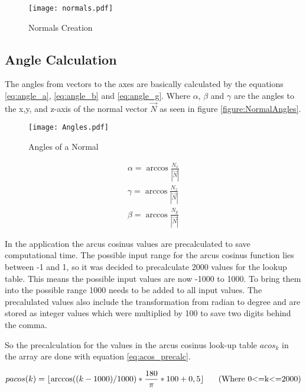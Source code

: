 \begin{figure}[H]
\begin{center}
  \texttt{[image: normals.pdf]}
  \caption{Normals Creation}
  \label{figure:normals}
\end{center}
\end{figure}

\subsection{Angle Calculation}

The angles from vectors to the axes are basically calculated by the equations \ref{eq:angle_a}, \ref{eq:angle_b} and
\vref{eq:angle_g}. Where $\alpha$, $\beta$ and $\gamma$ are the angles to the x,y, and z-axis 
of the normal vector $\vec{N}$ as seen in figure \vref{figure:NormalAngles}.

\begin{figure}[H]
\begin{center}
  \texttt{[image: Angles.pdf]}
  \caption{Angles of a Normal}
  \label{figure:NormalAngles}
\end{center} 
\end{figure}

\begin{align}
 \alpha = \arccos \frac{N_x}{\left|\vec{N}\right|}  
\label{eq:angle_a}\\
 \gamma = \arccos \frac{N_z}{\left|\vec{N}\right|}  
\label{eq:angle_b}\\
 \beta  = \arccos \frac{N_y}{\left|\vec{N}\right|}  
\label{eq:angle_g}
\end{align}


In the application the arcus cosinus values are precalculated to save computational time.
The possible input range for the arcus cosinus function lies between -1 and 1, so it was decided
to precalculate 2000 values for the lookup table. This means the possible input values are now
-1000 to 1000. To bring them into the possible range 1000 needs to be added to all input values.
The precalulated values also include the transformation from radian to degree and are stored as 
integer values which were multiplied by 100 to save two digits behind the comma.

So the precalculation for the values in the arcus cosinus look-up table $acos_k$ 
in the array are done with equation \vref{eq:acos_precalc}.

\begin{equation}
	pacos(k)=\lfloor \arccos ((k-1000)/1000) * \frac{180}{\pi}*100 + 0,5 \rfloor
	\mbox{\hspace{0.5cm} (Where 0<=k<=2000)}
	\label{eq:acos_precalc}
\end{equation}


